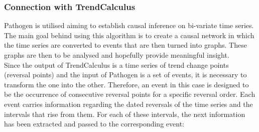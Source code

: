 \documentclass[a4, 11pt]{article}
\begin{document}


\subsubsection{Connection with TrendCalculus}
Pathogen is utilised aiming to establish causal inference on bi-variate time series. The main goal behind using this algorithm is to create a causal network in which the time series are converted to events that are then turned into graphs. These graphs are then to be analysed and hopefully provide meaningful insight. \\[2ex]
Since the output of TrendCalculus is a time series of trend change points (reversal points) and the input of Pathogen is a set of events, it is necessary to transform the one into the other. 
Therefore, an event in this case is designed to be the occurrence of consecutive reversal points for a specific reversal order. Each event carries information regarding the dated reversals of the time series and the intervals that rise from them. 
For each of these intervals, the next information has been extracted and passed to the corresponding event:
\end{document}
